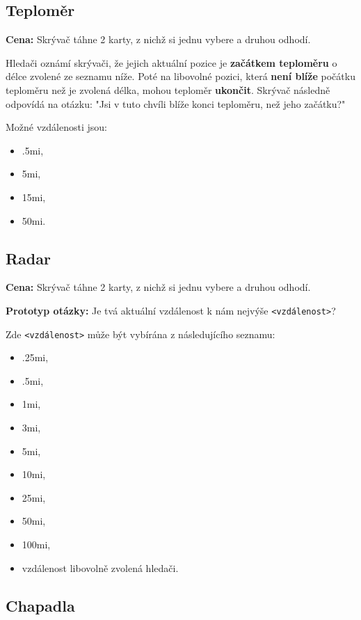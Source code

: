 \subsection{Teploměr}

\textbf{Cena:} Skrývač táhne 2 karty, z nichž si jednu vybere a druhou odhodí.

Hledači oznámí skrývači, že jejich aktuální pozice je \textbf{začátkem teploměru} o délce zvolené ze seznamu níže. Poté na libovolné pozici, která \textbf{není blíže} počátku teploměru než je zvolená délka, mohou teploměr \textbf{ukončit}. Skrývač následně odpovídá na otázku: "Jsi v tuto chvíli blíže konci teploměru, než jeho začátku?"

Možné vzdálenosti jsou:
\begin{itemize}
	\item \dist.5mi,
	\item \dist5mi,
	\item \dist15mi,
	\item \dist50mi.
\end{itemize}


\subsection{Radar}

\textbf{Cena:} Skrývač táhne 2 karty, z nichž si jednu vybere a druhou odhodí.

\textbf{Prototyp otázky:} Je tvá aktuální vzdálenost k nám nejvýše \verb|<vzdálenost>|?

Zde \verb|<vzdálenost>| může být vybírána z následujícího seznamu:
\begin{itemize}
	\item \dist.25mi,
	\item \dist.5mi,
	\item \dist1mi,
	\item \dist3mi,
	\item \dist5mi,
	\item \dist10mi,
	\item \dist25mi,
	\item \dist50mi,
	\item \dist100mi,
	\item vzdálenost libovolně zvolená hledači.
\end{itemize}

\subsection{Chapadla}

